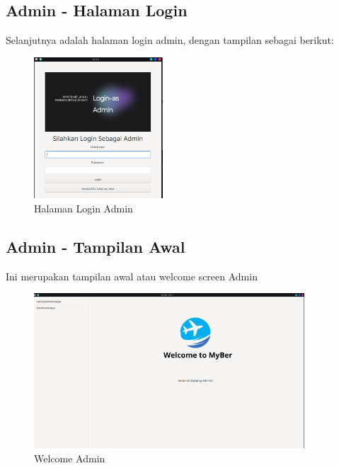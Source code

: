 \documentclass[a4paper,12pt]{article}
\begin{document}
\subsection{Admin - Halaman Login}
Selanjutnya adalah halaman login admin, dengan tampilan sebagai berikut:
\begin{figure}[!htbp]
    \centering
    \includegraphics[width=0.43\textwidth]{./Login_admin.png}
    \caption{Halaman Login Admin}

\end{figure}
\FloatBarrier 

\subsection{Admin - Tampilan Awal}
Ini merupakan tampilan awal atau welcome screen Admin
\begin{figure}[!htbp]
    \centering
    \includegraphics[width=0.9\textwidth]{./Home_Admin.png}
    \caption{Welcome Admin}

\end{figure}
\FloatBarrier 
\end{document}
